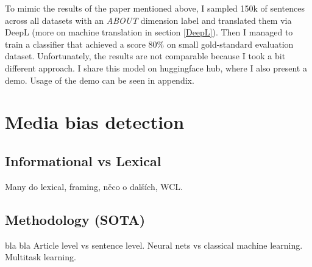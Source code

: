 To mimic the results of the paper mentioned above, I sampled 150k of sentences across all datasets with an \textit{ABOUT} dimension label and translated them via DeepL (more on machine translation in section \ref{DeepL}). Then I managed to train a classifier that achieved a score 80\% on small gold-standard evaluation dataset. Unfortunately, the results are not comparable because I took a bit different approach. I share this model on huggingface hub, where I also present a demo. Usage of the demo can be seen in appendix.


\section{Media bias detection}
\subsection{Informational vs Lexical}
Many do lexical, framing, něco o dalších, WCL.
\subsection{Methodology (SOTA)}\label{methodology}
bla bla Article level vs sentence level. Neural nets vs classical machine learning. Multitask learning.


